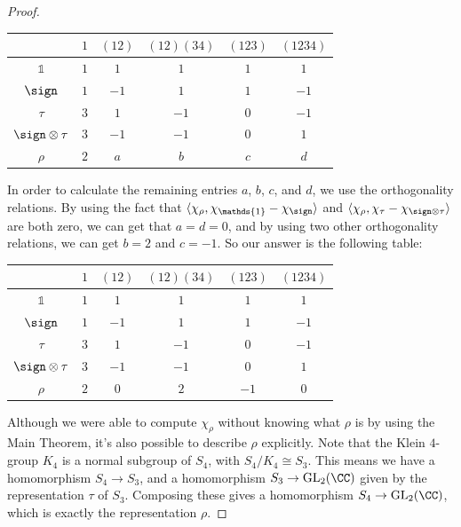 \begin{proof}
\begin{center}
    \begin{tabular}{c||c|c|c|c|c}
    & $1$ & $(12)$ & $(12)(34)$ & $(123)$ & $(1234)$ \\
    \hline 
    \hline 
    $\mathds{1}$ & $1$ & $1$ & $1$ & $1$ & $1$ \\ 
    \hline 
    $\sign$ & $1$ & $-1$ & $1$ & $1$ & $-1$ \\
    \hline 
    $\tau$ & $3$ & $1$ & $-1$ & $0$ & $-1$ \\
    \hline 
    $\sign \otimes \tau$ & $3$ & $-1$ & $-1$ & $0$ & $1$ \\
    \hline 
    $\rho$ & $2$ & $a$ & $b$ & $c$ & $d$
    \end{tabular}
\end{center}
In order to calculate the remaining entries $a$, $b$, $c$, and $d$, we use the orthogonality relations. By using the fact that $\langle \chi_\rho, \chi_{\mathds{1}} - \chi_{\sign} \rangle$ and $\langle \chi_\rho, \chi_{\tau} - \chi_{\sign \otimes \tau} \rangle$ are both zero, we can get that $a = d = 0$, and by using two other orthogonality relations, we can get $b = 2$ and $c = -1$. So our answer is the following table: 
\begin{center}
    \begin{tabular}{c||c|c|c|c|c}
    & $1$ & $(12)$ & $(12)(34)$ & $(123)$ & $(1234)$ \\
    \hline 
    \hline 
    $\mathds{1}$ & $1$ & $1$ & $1$ & $1$ & $1$ \\ 
    \hline 
    $\sign$ & $1$ & $-1$ & $1$ & $1$ & $-1$ \\
    \hline 
    $\tau$ & $3$ & $1$ & $-1$ & $0$ & $-1$ \\
    \hline 
    $\sign \otimes \tau$ & $3$ & $-1$ & $-1$ & $0$ & $1$ \\
    \hline 
    $\rho$ & $2$ & $0$ & $2$ & $-1$ & $0$
    \end{tabular}
\end{center}
Although we were able to compute $\chi_\rho$ without knowing what $\rho$ is by using the Main Theorem, it's also possible to describe $\rho$ explicitly. Note that the Klein $4$-group $K_4$ is a normal subgroup of $S_4$, with $S_4/K_4 \cong S_3$. This means we have a homomorphism $S_4 \to S_3$, and a homomorphism $S_3 \to \operatorname{GL}_2(\CC)$ given by the representation $\tau$ of $S_3$. Composing these gives a homomorphism $S_4 \to \operatorname{GL}_2(\CC)$, which is exactly the representation $\rho$. 
\end{proof}


